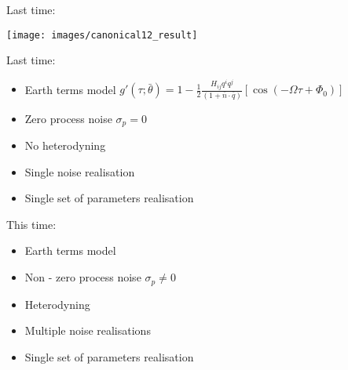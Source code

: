 \documentclass[10pt]{beamer}
\title{}
\subtitle{}
\author{}
\date{EE/GW meeting, May 25, 2023}
\begin{document}
	
	\maketitle
	
	\begin{frame}{}
		
		Last time: 
		
\texttt{[image: images/canonical12\_result]}


\end{frame}


	\begin{frame}{}
	
	Last time: 
	
	\begin{itemize}
		\item Earth terms model $g'(\tau; \bar{\theta}) = 1 - \frac{1}{2} \frac{ H_{ij}q^i q^j }{(1 + \bar{n}\cdot \bar{q}) } \left[ \cos(-\Omega \tau +\Phi_0) \right]$
		\item Zero process noise  $\sigma_p = 0$
		\item No heterodyning
		\item Single noise realisation
		\item Single set of parameters realisation
    \end{itemize}	

\end{frame}



	\begin{frame}{}
	
	This time: 
	
	\begin{itemize}
		\item Earth terms model 
		\item \alert{Non - zero process noise  $\sigma_p \neq 0$}
		\item \alert{Heterodyning}
		\item \alert{Multiple noise realisations}
		\item Single set of parameters realisation
	\end{itemize}	
	
\end{frame}
\end{document}

